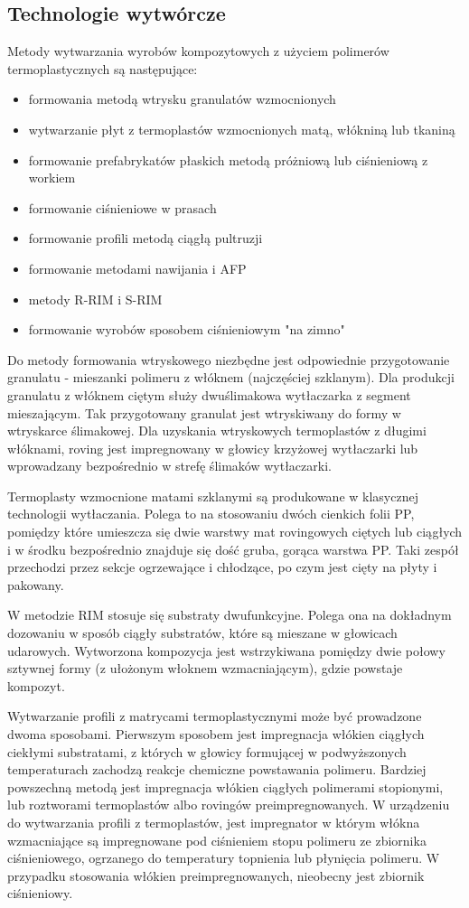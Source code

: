 \documentclass[magister,druk]{dyplom}
\begin{document}
\subsection{Technologie wytwórcze}

Metody wytwarzania wyrobów kompozytowych z użyciem polimerów termoplastycznych są następujące:
\begin{itemize}	
	\item formowania metodą wtrysku granulatów wzmocnionych
	\item wytwarzanie płyt z termoplastów wzmocnionych matą, włókniną lub tkaniną
	\item formowanie prefabrykatów płaskich metodą próżniową lub ciśnieniową z workiem
	\item formowanie ciśnieniowe w prasach
	\item formowanie profili metodą ciągłą pultruzji
	\item formowanie metodami nawijania i AFP
	\item metody R-RIM i S-RIM
	\item formowanie wyrobów sposobem ciśnieniowym "na zimno"
\end{itemize}

Do metody formowania wtryskowego niezbędne jest odpowiednie przygotowanie granulatu - mieszanki polimeru z włóknem (najczęściej szklanym). Dla produkcji granulatu z włóknem ciętym służy dwuślimakowa wytłaczarka z segment mieszającym. Tak przygotowany granulat jest wtryskiwany do formy w wtryskarce ślimakowej. Dla uzyskania wtryskowych termoplastów z długimi włóknami, roving jest impregnowany w głowicy krzyżowej wytłaczarki lub wprowadzany bezpośrednio w strefę ślimaków wytłaczarki.

Termoplasty wzmocnione matami szklanymi są produkowane w klasycznej technologii wytłaczania. Polega to na stosowaniu dwóch cienkich folii PP, pomiędzy które umieszcza się dwie warstwy mat rovingowych ciętych lub ciągłych i w środku bezpośrednio znajduje się dość gruba, gorąca warstwa PP. Taki zespół przechodzi przez sekcje ogrzewające i chłodzące, po czym jest cięty na płyty i pakowany. 

W metodzie RIM stosuje się substraty dwufunkcyjne. Polega ona na dokładnym dozowaniu w sposób ciągły substratów, które są mieszane w głowicach udarowych. Wytworzona kompozycja jest wstrzykiwana pomiędzy dwie połowy sztywnej formy (z ułożonym włoknem wzmacniającym), gdzie powstaje kompozyt. 

Wytwarzanie profili z matrycami termoplastycznymi może być prowadzone dwoma sposobami. Pierwszym sposobem jest impregnacja włókien ciągłych ciekłymi substratami, z których w głowicy formującej w podwyższonych temperaturach zachodzą reakcje chemiczne powstawania polimeru. Bardziej powszechną metodą jest impregnacja włókien ciągłych polimerami stopionymi, lub roztworami termoplastów albo rovingów preimpregnowanych. W urządzeniu do wytwarzania profili z termoplastów, jest impregnator w którym włókna wzmacniające są impregnowane pod ciśnieniem stopu polimeru ze zbiornika ciśnieniowego, ogrzanego do temperatury topnienia lub płynięcia polimeru\cite{Krolikowski2012}. W przypadku stosowania włókien preimpregnowanych, nieobecny jest zbiornik ciśnieniowy. 
\end{document}
